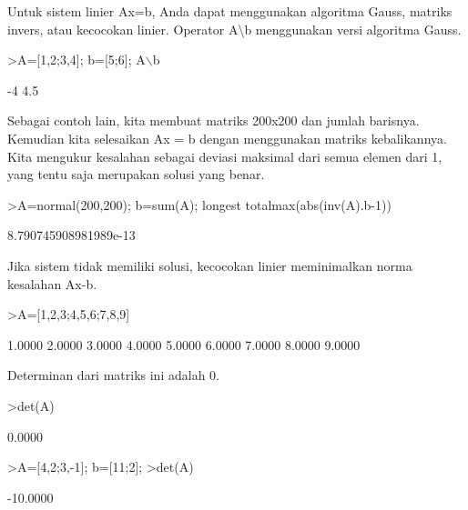 \documentclass{article}
\begin{document}
\begin{eulernotebook}
\begin{eulercomment}
Untuk sistem linier Ax=b, Anda dapat menggunakan algoritma Gauss,
matriks invers, atau kecocokan linier. Operator A\textbackslash{}b menggunakan versi
algoritma Gauss.
\end{eulercomment}
\begin{eulerprompt}
>A=[1,2;3,4]; b=[5;6]; A\(\backslash\)b
\end{eulerprompt}
\begin{euleroutput}
             -4 
            4.5 
\end{euleroutput}
\begin{eulercomment}
Sebagai contoh lain, kita membuat matriks 200x200 dan jumlah barisnya.
Kemudian kita selesaikan Ax = b dengan menggunakan matriks
kebalikannya. Kita mengukur kesalahan sebagai deviasi maksimal dari
semua elemen dari 1, yang tentu saja merupakan solusi yang benar.
\end{eulercomment}
\begin{eulerprompt}
>A=normal(200,200); b=sum(A); longest totalmax(abs(inv(A).b-1))
\end{eulerprompt}
\begin{euleroutput}
    8.790745908981989e-13 
\end{euleroutput}
\begin{eulercomment}
Jika sistem tidak memiliki solusi, kecocokan linier meminimalkan norma
kesalahan Ax-b.
\end{eulercomment}
\begin{eulerprompt}
>A=[1,2,3;4,5,6;7,8,9]
\end{eulerprompt}
\begin{euleroutput}
       1.0000      2.0000      3.0000 
       4.0000      5.0000      6.0000 
       7.0000      8.0000      9.0000 
\end{euleroutput}
\begin{eulercomment}
Determinan dari matriks ini adalah 0.
\end{eulercomment}
\begin{eulerprompt}
>det(A)
\end{eulerprompt}
\begin{euleroutput}
       0.0000 
\end{euleroutput}
\begin{eulerprompt}
>A=[4,2;3,-1]; b=[11;2];
>det(A)
\end{eulerprompt}
\begin{euleroutput}
     -10.0000 
\end{euleroutput}
\begin{eulerprompt}

\end{eulerprompt}
\end{eulernotebook}
\end{document}
